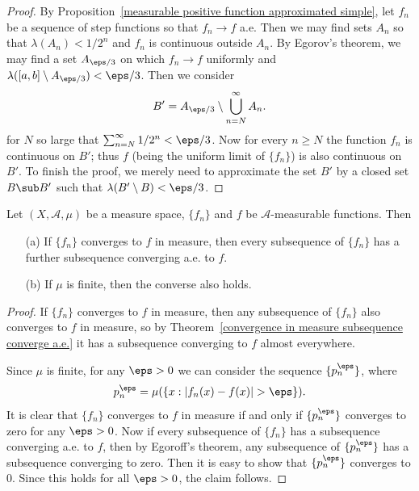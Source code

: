 \begin{proof}
By Proposition~\ref{measurable positive function approximated simple}, let $f_n$ be a sequence of step functions so that $f_n\to f$ a.e. Then we may find sets $A_n$ so that $\lambda(A_n)<1/2^n$ and $f_n$ is continuous outside $A_n$. By Egorov's theorem, we may find a set $A_{\eps/3}$ on which
$f_n\to f$ uniformly and $\lambda([a,b]\setminus A_{\eps/3})<\eps/3$. Then we consider
\[B'=A_{\eps/3}\setminus\bigcup_{n=N}^{\infty}A_n.\]
for $N$ so large that $\sum_{n=N}^{\infty}1/2^n<\eps/3$. Now for every $n\geq N$ the function $f_n$ is continuous on $B'$; thus $f$ (being the uniform limit of $\{f_n\}$) is also continuous on $B'$. To finish the proof, we merely need to approximate the set $B'$ by a closed set $B\sub B'$ such that $\lambda(B'\setminus B)<\eps/3$.
\end{proof}\begin{corollary}
Let $(X,\mathcal{A},\mu)$ be a measure space, $\{f_n\}$ and $f$ be $\mathcal{A}$-measurable functions. Then
\begin{itemize}
\item[(a)] If $\{f_n\}$ converges to $f$ in measure, then every subsequence of $\{f_n\}$ has a further subsequence converging a.e. to $f$.
\item[(b)] If $\mu$ is finite, then the converse also holds.
\end{itemize}
\end{corollary}
\begin{proof}
If $\{f_n\}$ converges to $f$ in measure, then any subsequence of $\{f_n\}$ also converges to $f$ in measure, so by Theorem~\ref{convergence in measure subsequence converge a.e.} it has a subsequence converging to $f$ almost everywhere.\par
Since $\mu$ is finite, for any $\eps>0$ we can consider the sequence $\{p_n^\eps\}$, where
\[p_n^\eps=\mu(\{x:|f_n(x)-f(x)|>\eps\}).\]
It is clear that $\{f_n\}$ converges to $f$ in measure if and only if $\{p_n^\eps\}$ converges to zero for any $\eps>0$. Now if every subsequence of $\{f_n\}$ has a subsequence converging a.e. to $f$, then by Egoroff's theorem, any subsequence of $\{p_n^\eps\}$ has a subsequence converging to zero. Then it is easy to show that $\{p_n^\eps\}$ converges to $0$. Since this holds for all $\eps>0$, the claim follows.
\end{proof}
